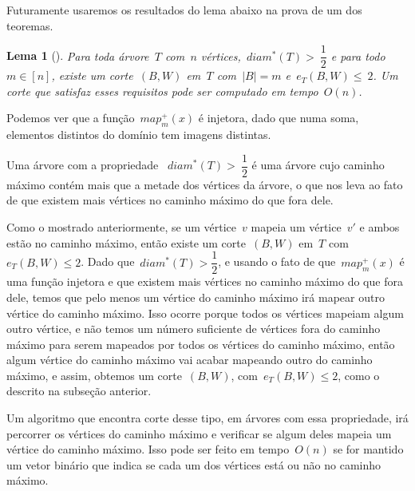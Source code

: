\documentclass[a4paper,12pt]{article}
\newtheorem{lem}{Lema}
\begin{document}
	Futuramente usaremos os resultados do lema abaixo na prova de 
	um dos teoremas.

	\begin{lem}[{\cite[Lemma 5]{Schmidt15}}]
	\label{lema:caminhoLongo}
		Para toda árvore~$T$ com~$n$ 
		vértices,~$diam^*(T)>~\dfrac{1}{2}$
		e para todo~$m\in[n]$, existe um corte~$(B,W)$ em~$T$
		com~$|B|=m$ e~$e_T(B,W)\le~2$. Um corte que satisfaz esses
		requisitos pode ser computado em tempo~$O(n)$.
	\end{lem}

	\medskip
	\medskip

	Podemos ver que a função~$map^+_m(x)$ é injetora, dado que numa
	soma, elementos distintos do domínio tem imagens distintas.

	Uma árvore com a propriedade ~$diam^*(T)>~\dfrac{1}{2}$ é uma
	árvore cujo caminho máximo contém mais que a metade dos 
	vértices da árvore, o que nos leva ao fato de que existem mais 
	vértices no caminho máximo do que fora dele. 

	Como o mostrado anteriormente, se um vértice~$v$ mapeia um
	vértice~$v'$ e ambos estão no caminho máximo, então existe um
	corte~$(B,W)$ em~$T$ com~$e_T(B,W)\le 2$.
	Dado que~$diam^*(T)>\dfrac{1}{2}$, e usando o fato de 
	que~$map^+_m(x)$ é uma função injetora e que
	existem mais vértices no caminho máximo do que fora dele,
	temos que pelo menos um vértice do caminho máximo irá mapear
	outro vértice do caminho máximo. Isso ocorre porque todos
	os vértices mapeiam algum outro vértice, e não temos um 
	número suficiente de vértices fora do caminho máximo para serem
	mapeados por todos os vértices do caminho máximo, então algum
	vértice do caminho máximo vai acabar mapeando outro do caminho
	máximo, e assim, obtemos um corte~$(B,W)$, com~$e_T(B,W)\le 2$,
	como o descrito na subseção anterior.

	Um algoritmo que encontra corte desse tipo, em árvores com 
	essa propriedade, irá percorrer os vértices do caminho máximo
	e verificar se algum deles mapeia um vértice do caminho máximo.
	Isso pode ser feito em tempo~$O(n)$ se for mantido um vetor 
	binário que indica se cada um dos vértices está ou não no
	caminho máximo.

	{\color{red}{-O algoritmo é bem simples. Não precisa colocar
	código né?}}



\newpage
\end{document}
